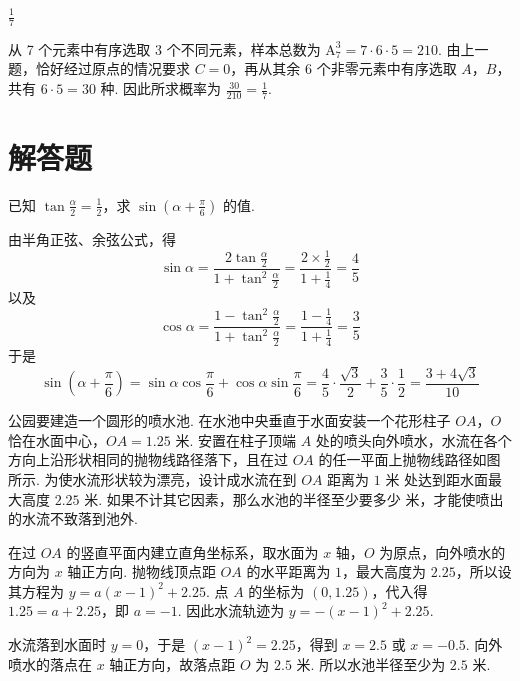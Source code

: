 \begin{answer}
\(\frac{1}{7}\)
\end{answer}

\begin{solution}
从 7 个元素中有序选取 3 个不同元素，样本总数为 \(\mathrm A_7^3=7\cdot6\cdot5=210\). 由上一题，恰好经过原点的情况要求 \(C=0\)，再从其余 6 个非零元素中有序选取 \(A\)，\(B\)，共有 \(6\cdot5=30\) 种. 因此所求概率为 \(\frac{30}{210}=\frac17\).
\end{solution}

\section{解答题}

\begin{problem}
已知 \(\tan\frac{\alpha}{2}=\frac{1}{2}\)，求 \(\sin \left(\alpha +\frac{\pi}{6}\right)\) 的值.
\end{problem}

\begin{solution}
由半角正弦、余弦公式，得
\[
\sin\alpha=\frac{2\tan\frac\alpha2}{1+\tan^2\frac\alpha2}=\frac{2\times\frac12}{1+\frac14}=\frac45
\]
以及
\[
\cos\alpha=\frac{1-\tan^2\frac\alpha2}{1+\tan^2\frac\alpha2}=\frac{1-\frac14}{1+\frac14}=\frac35
\]
于是
\[
\sin\left(\alpha+\frac\pi6\right)=\sin\alpha\cos\frac\pi6+\cos\alpha\sin\frac\pi6=\frac45\cdot\frac{\sqrt3}{2}+\frac35\cdot\frac12=\frac{3+4\sqrt3}{10}
\]
\end{solution}

\begin{problem}
公园要建造一个圆形的喷水池. 在水池中央垂直于水面安装一个花形柱子 \(OA\)，\(O\) 恰在水面中心，\(OA=1.25\text{ 米}\). 安置在柱子顶端 \(A\) 处的喷头向外喷水，水流在各个方向上沿形状相同的抛物线路径落下，且在过 \(OA\) 的任一平面上抛物线路径如图所示. 为使水流形状较为漂亮，设计成水流在到 \(OA\) 距离为 \(1\text{ 米}\) 处达到距水面最大高度 \(2.25\text{ 米}\). 如果不计其它因素，那么水池的半径至少要多少\(\text{ 米}\)，才能使喷出的水流不致落到池外.

\end{problem}

\begin{solution}
在过 \(OA\) 的竖直平面内建立直角坐标系，取水面为 \(x\) 轴，\(O\) 为原点，向外喷水的方向为 \(x\) 轴正方向. 抛物线顶点距 \(OA\) 的水平距离为 \(1\)，最大高度为 \(2.25\)，所以设其方程为 \(y=a(x-1)^2+2.25\). 点 \(A\) 的坐标为 \((0,1.25)\)，代入得 \(1.25=a+2.25\)，即 \(a=-1\). 因此水流轨迹为 \(y=-(x-1)^2+2.25\).

水流落到水面时 \(y=0\)，于是 \((x-1)^2=2.25\)，得到 \(x=2.5\) 或 \(x=-0.5\). 向外喷水的落点在 \(x\) 轴正方向，故落点距 \(O\) 为 \(2.5\text{ 米}\). 所以水池半径至少为 \(2.5\text{ 米}\).
\end{solution}

